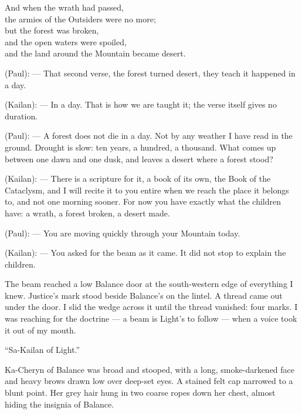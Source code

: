 \begin{scripture}
And when the wrath had passed, \\
the armies of the Outsiders were no more; \\
but the forest was broken, \\
and the open waters were spoiled, \\
and the land around the Mountain became desert. \\
\end{scripture}


\begin{room}

(Paul): --- That second verse, the forest turned desert, they teach it happened in a day.

(Kailan): --- In a day. That is how we are taught it; the verse itself gives no duration.

(Paul): --- A forest does not die in a day. Not by any weather I have read in the ground. Drought is slow: ten years, a hundred, a thousand. What comes up between one dawn and one dusk, and leaves a desert where a forest stood?

(Kailan): --- There is a scripture for it, a book of its own, the Book of the Cataclysm, and I will recite it to you entire when we reach the place it belongs to, and not one morning sooner. For now you have exactly what the children have: a wrath, a forest broken, a desert made. 

(Paul): --- You are moving quickly through your Mountain today.

(Kailan): --- You asked for the beam as it came. It did not stop to explain the children.

\end{room}

The beam reached a low Balance door at the south-western edge of everything I knew. Justice's mark stood beside Balance's on the lintel. A thread came out under the door. I slid the wedge across it until the thread vanished: four marks. I was reaching for the doctrine --- a beam is Light's to follow --- when a voice took it out of my mouth.\par

``Sa-Kailan of Light.'' \par

Ka-Cheryn of Balance was broad and stooped, with a long, smoke-darkened face and heavy brows drawn low over deep-set eyes. A stained felt cap narrowed to a blunt point. Her grey hair hung in two coarse ropes down her chest, almost hiding the insignia of Balance.

